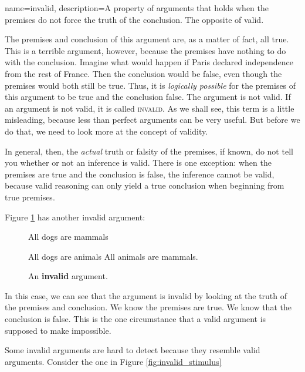 {
name=invalid,
description={A property of arguments that holds when the premises do not force the truth of the conclusion. The opposite of valid.}
}
 

The premises and conclusion of this argument are, as a matter of fact, all true. This is a terrible argument, however, because the premises have nothing to do with the conclusion. Imagine what would happen if Paris declared independence from the rest of France. Then the conclusion would be false, even though the premises would both still be true. Thus, it is \emph{logically possible} for the premises of this argument to be true and the conclusion false. The argument is not valid.  If an argument is not valid, it is called \textsc{\gls{invalid}}. \label{def:invalid} As we shall see, this term is a little misleading, because less than perfect arguments can be very useful. But before we do that, we need to look more at the concept of validity.

In general, then, the \textit{actual }truth or falsity of the premises, if known, do not tell you whether or not an inference is valid. There is one exception: when the premises are true and the conclusion is false, the inference cannot be valid, because valid reasoning can only yield a true conclusion when beginning from true premises. 
 
Figure \ref{fig:invalid_animals} has another invalid argument:

\begin{figure}
\begin{mdframed}[style=mytablehalfbox]
\begin{earg*}
\item All dogs are mammals
\item All dogs are animals
\itemc All animals are mammals.
\end{earg*}
\end{mdframed}
\caption{An \textbf{invalid} argument.} \label{fig:invalid_animals}
\end{figure}

In this case, we can see that the argument is invalid by looking at the truth of the premises and conclusion. We know the premises are true. We know that the conclusion is false. This is the one circumstance that a valid argument is supposed to make impossible. 

Some invalid arguments are hard to detect because they resemble valid arguments. Consider the one in Figure \ref{fig:invalid_stimulus}

